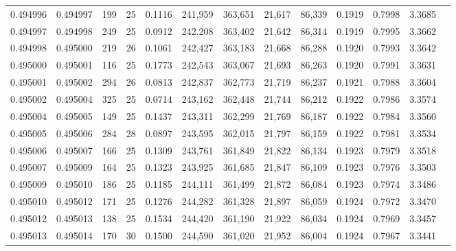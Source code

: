 \begin{tabular}{rrrrrrrrrrrrr}
0.494996 & 0.494997 & 199 &  25 &                                     0.1116 & 241,959 & 363,651 &  21,617 &  86,339 & 0.1919 & 0.7998 & 3.3685 \\
0.494997 & 0.494998 & 249 &  25 &                                     0.0912 & 242,208 & 363,402 &  21,642 &  86,314 & 0.1919 & 0.7995 & 3.3662 \\
0.494998 & 0.495000 & 219 &  26 &                                     0.1061 & 242,427 & 363,183 &  21,668 &  86,288 & 0.1920 & 0.7993 & 3.3642 \\
0.495000 & 0.495001 & 116 &  25 &                                     0.1773 & 242,543 & 363,067 &  21,693 &  86,263 & 0.1920 & 0.7991 & 3.3631 \\
0.495001 & 0.495002 & 294 &  26 &                                     0.0813 & 242,837 & 362,773 &  21,719 &  86,237 & 0.1921 & 0.7988 & 3.3604 \\
0.495002 & 0.495004 & 325 &  25 &                                     0.0714 & 243,162 & 362,448 &  21,744 &  86,212 & 0.1922 & 0.7986 & 3.3574 \\
0.495004 & 0.495005 & 149 &  25 &                                     0.1437 & 243,311 & 362,299 &  21,769 &  86,187 & 0.1922 & 0.7984 & 3.3560 \\
0.495005 & 0.495006 & 284 &  28 &                                     0.0897 & 243,595 & 362,015 &  21,797 &  86,159 & 0.1922 & 0.7981 & 3.3534 \\
0.495006 & 0.495007 & 166 &  25 &                                     0.1309 & 243,761 & 361,849 &  21,822 &  86,134 & 0.1923 & 0.7979 & 3.3518 \\
0.495007 & 0.495009 & 164 &  25 &                                     0.1323 & 243,925 & 361,685 &  21,847 &  86,109 & 0.1923 & 0.7976 & 3.3503 \\
0.495009 & 0.495010 & 186 &  25 &                                     0.1185 & 244,111 & 361,499 &  21,872 &  86,084 & 0.1923 & 0.7974 & 3.3486 \\
0.495010 & 0.495012 & 171 &  25 &                                     0.1276 & 244,282 & 361,328 &  21,897 &  86,059 & 0.1924 & 0.7972 & 3.3470 \\
0.495012 & 0.495013 & 138 &  25 &                                     0.1534 & 244,420 & 361,190 &  21,922 &  86,034 & 0.1924 & 0.7969 & 3.3457 \\
0.495013 & 0.495014 & 170 &  30 &                                     0.1500 & 244,590 & 361,020 &  21,952 &  86,004 & 0.1924 & 0.7967 & 3.3441 \\

\end{tabular}
